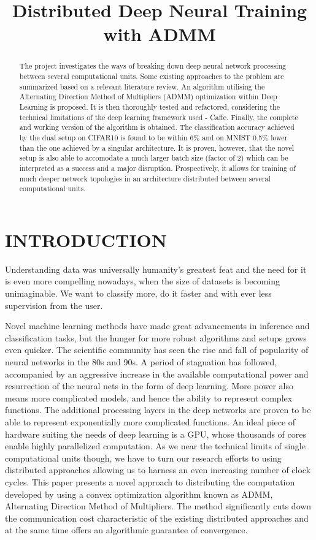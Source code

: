 \documentclass[letterpaper]{article}
\title{Distributed Deep Neural Training with ADMM}
\author{} %
\begin{document}
\maketitle

\begin{abstract}
The project investigates the ways of breaking down deep neural network processing between several computational units. Some existing approaches to the problem are summarized based on a relevant literature review.
An algorithm utilising the Alternating Direction Method of Multipliers (ADMM) optimization within Deep Learning is proposed. It is then thoroughly tested and refactored, considering the technical limitations of the deep learning framework used - Caffe. Finally, the complete and working version of the algorithm is obtained.
The classification accuracy achieved by the dual setup on CIFAR10 is found to be within 6\% and on MNIST 0.5\% lower than the one achieved by a singular architecture. It is proven, however, that the novel setup is also able to accomodate a much larger batch size (factor of 2) which can be interpreted as a success and a major disruption. Prospectively, it allows for training of much deeper network topologies in an architecture distributed between several computational units.
\end{abstract}

\section{INTRODUCTION}

Understanding data was universally humanity's greatest feat and the need for it is even more compelling nowadays, when the size of datasets is becoming unimaginable. We want to classify more, do it faster and with ever less supervision from the user.

Novel machine learning methods have made great advancements in inference and classification tasks, but the hunger for more robust algorithms and setups grows even quicker. The scientific community has seen the rise and fall of popularity of neural networks in the 80s and 90s. A period of stagnation has followed, accompanied by an aggressive increase in the available computational power and resurrection of the neural nets in the form of deep learning. More power also means more complicated models, and hence the ability to represent complex functions. The additional processing layers in the deep networks are proven to be able to represent exponentially more complicated functions. An ideal piece of hardware suiting the needs of deep learning is a GPU, whose thousands of cores enable highly parallelized computation. As we near the technical limits of single computational units though, we have to turn our research efforts to using distributed approaches allowing us to harness an even increasing number of clock cycles. This paper presents a novel approach to distributing the computation developed by using a convex optimization algorithm known as ADMM, Alternating Direction Method of Multipliers. The method significantly cuts down the communication cost characteristic of the existing distributed approaches and at the same time offers an algorithmic guarantee of convergence.
\end{document}
